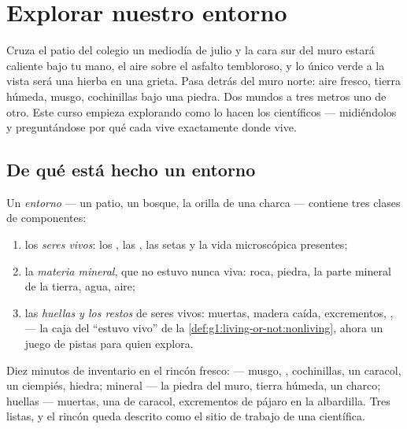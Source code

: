 \chapter{Explorar nuestro entorno}\label{ch:g6:exploring-our-environment}

Cruza el patio del colegio un mediodía de julio y la cara sur del muro
estará caliente bajo tu mano, el aire sobre el asfalto tembloroso, y
lo único verde a la vista será una hierba en una grieta. Pasa detrás
del muro norte: aire fresco, tierra húmeda, musgo, cochinillas bajo
una piedra. Dos mundos a tres metros uno de otro. Este curso empieza
explorando  como lo hacen los científicos --- midiéndolos y
preguntándose por qué cada  vive exactamente donde vive.

\section{De qué está hecho un entorno}

\begin{definition}\label{def:g6:exploring-our-environment:components}
Un \emph{entorno} --- un patio, un bosque, la orilla de
una charca --- contiene tres clases de componentes:
\begin{enumerate}
  \item los \emph{seres vivos}: los , las
        , las setas y la vida microscópica presentes;
  \item la \emph{materia mineral}, que no
        estuvo nunca viva: roca, piedra, la parte mineral de la
        tierra, agua, aire;
  \item las \emph{huellas y los restos} de seres vivos:  muertas,
        madera caída, excrementos, ,  --- la caja del
        ``estuvo vivo'' de la \cref{def:g1:living-or-not:nonliving},
        ahora un juego de pistas para quien explora.
\end{enumerate}
\end{definition}

\begin{example}\label{ex:g6:exploring-our-environment:inventory}
Diez minutos de inventario en el rincón fresco:  --- musgo,
, cochinillas, un caracol, un ciempiés, hiedra; mineral --- la
piedra del muro, tierra húmeda, un charco; huellas ---  muertas,
una  de caracol, excrementos de pájaro en la albardilla. Tres
listas, y el rincón queda descrito como el sitio de trabajo de una
científica.
\end{example}


